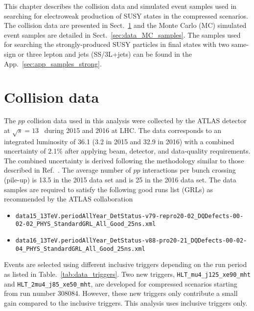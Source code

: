 This chapter describes the collision data and simulated event samples used in searching for electroweak production of SUSY states in the compressed scenarios.
The collision data are presented in Sect.~\ref{sec:data_collision_data} and the Monte Carlo (MC) simulated event samples are detailed in Sect.~\ref{sec:data_MC_samples}.
The samples used for searching the strongly-produced SUSY particles in final states with two same-sign or three lepton and jets (SS/3L+jets) can be found in the App.~\ref{sec:app_samples_strong}.


\section{Collision data}
\label{sec:data_collision_data}
The $pp$ collision data used in this analysis were collected by the ATLAS detector at $\sqrt{s} = 13$~{\TeV} during 2015 and 2016 at LHC.
The data corresponds to an integrated luminosity of 36.1 \ifb (3.2 \ifb in 2015 and 32.9 \ifb in 2016) with a combined uncertainty of 2.1\% after applying beam, detector, and data-quality requirements.
The combined uncertainty is derived following the methodology similar to those described in Ref.~\cite{Aaboud:2016hhf}.
The average number of $pp$ interactions per bunch crossing (pile-up) is 13.5 in the 2015 data set and is 25 in the 2016 data set.
The data samples are required to satisfy the following good runs list (GRLs) as recommended by the ATLAS collaboration
%
\begin{itemize}
    \item {\scriptsize \texttt{data15\_13TeV.periodAllYear\_DetStatus-v79-repro20-02\_DQDefects-00-02-02\_PHYS\_StandardGRL\_All\_Good\_25ns.xml}}
    \item {\scriptsize \texttt{data16\_13TeV.periodAllYear\_DetStatus-v88-pro20-21\_DQDefects-00-02-04\_PHYS\_StandardGRL\_All\_Good\_25ns.xml}}
\end{itemize}
%
Events are selected using different inclusive \met triggers depending on the run period as listed in Table.~\ref{tab:data_triggers}.
Two new triggers, \texttt{HLT\_mu4\_j125\_xe90\_mht} and \texttt{HLT\_2mu4\_j85\_xe50\_mht}, are developed for compressed scenarios starting from run number 308084.
However, these new triggers only contribute a small gain compared to the inclusive \met triggers.
This analysis uses inclusive \met triggers only.

